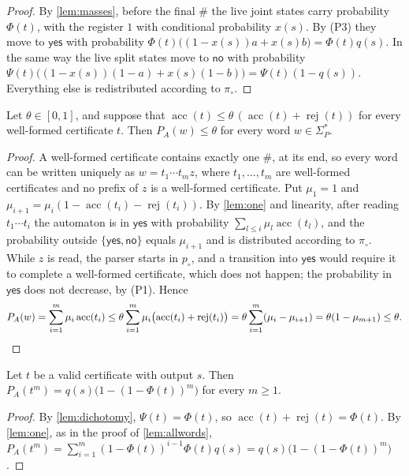 \documentclass[11pt]{article}
\theoremstyle{plain}
\theoremstyle{definition}
\theoremstyle{remark}
\newcommand{\yes}{\mathsf{yes}}
\newcommand{\no}{\mathsf{no}}
\newcommand{\acc}{\operatorname{acc}}
\newcommand{\rej}{\operatorname{rej}}
\newcommand{\pin}{p_{\circ}}
\begin{document}
\begin{proof}
By \cref{lem:masses}, before the final $\#$ the live joint states carry probability $\Phi(t)$, with the register $1$ with conditional probability $x(s)$. By (P3) they move to $\yes$ with probability $\Phi(t)\bigl((1-x(s))a+x(s)b\bigr)=\Phi(t)q(s)$. In the same way the live split states move to $\no$ with probability $\Psi(t)\bigl((1-x(s))(1-a)+x(s)(1-b)\bigr)=\Psi(t)(1-q(s))$. Everything else is redistributed according to $\pi_\circ$.
\end{proof}

\begin{lemma}\label{lem:allwords}
Let $\theta\in[0,1]$, and suppose that $\acc(t)\le\theta\,(\acc(t)+\rej(t))$ for every well-formed certificate $t$. Then $P_A(w)\le\theta$ for every word $w\in\Sigma_P^*$.
\end{lemma}

\begin{proof}
A well-formed certificate contains exactly one $\#$, at its end, so every word can be written uniquely as $w=t_1\cdots t_mz$, where $t_1,\dots,t_m$ are well-formed certificates and no prefix of $z$ is a well-formed certificate. Put $\mu_1=1$ and $\mu_{i+1}=\mu_i(1-\acc(t_i)-\rej(t_i))$. By \cref{lem:one} and linearity, after reading $t_1\cdots t_i$ the automaton is in $\yes$ with probability $\sum_{l\le i}\mu_l\acc(t_l)$, and the probability outside $\{\yes,\no\}$ equals $\mu_{i+1}$ and is distributed according to $\pi_\circ$. While $z$ is read, the parser starts in $\pin$, and a transition into $\yes$ would require it to complete a well-formed certificate, which does not happen; the probability in $\yes$ does not decrease, by (P1). Hence
\[
P_A(w)=\sum_{i=1}^m\mu_i\acc(t_i)\le\theta\sum_{i=1}^m\mu_i\bigl(\acc(t_i)+\rej(t_i)\bigr)=\theta\sum_{i=1}^m(\mu_i-\mu_{i+1})=\theta(1-\mu_{m+1})\le\theta.\qedhere
\]
\end{proof}

\begin{lemma}\label{lem:repeat}
Let $t$ be a valid certificate with output $s$. Then $P_A(t^m)=q(s)\bigl(1-(1-\Phi(t))^m\bigr)$ for every $m\ge1$.
\end{lemma}

\begin{proof}
By \cref{lem:dichotomy}, $\Psi(t)=\Phi(t)$, so $\acc(t)+\rej(t)=\Phi(t)$. By \cref{lem:one}, as in the proof of \cref{lem:allwords}, $P_A(t^m)=\sum_{i=1}^m(1-\Phi(t))^{i-1}\Phi(t)q(s)=q(s)\bigl(1-(1-\Phi(t))^m\bigr)$.
\end{proof}
\end{document}
